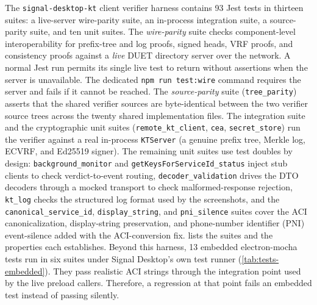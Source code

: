 The \texttt{signal-desktop-kt} client verifier harness contains \num{93} Jest tests in thirteen
suites: a live-server wire-parity suite, an in-process integration suite, a source-parity suite,
and ten unit suites. The \emph{wire-parity} suite checks component-level interoperability for
prefix-tree and log proofs, signed heads, VRF proofs, and consistency proofs against a \emph{live}
DUET directory server over the network. A normal Jest run permits its single live test to
return without assertions when the server is unavailable. The dedicated \texttt{npm run test:wire}
command requires the server and fails if it cannot be reached. The \emph{source-parity} suite
(\texttt{tree\_parity}) asserts that the shared verifier sources are byte-identical between the two
verifier source trees across the twenty shared implementation files. The integration suite and the
cryptographic unit suites (\texttt{remote\_kt\_client}, \texttt{cea}, \texttt{secret\_store}) run
the verifier against a real in-process \texttt{KTServer} (a genuine prefix tree, Merkle log, ECVRF,
and Ed25519 signer). The remaining unit suites use test doubles by design: \texttt{background\_monitor}
and \texttt{getKeysForServiceId\_status} inject stub clients to check verdict-to-event routing,
\texttt{decoder\_validation} drives the DTO decoders through a mocked transport to check
malformed-response rejection, \texttt{kt\_log} checks the structured log format used by the screenshots,
and the \texttt{canonical\_service\_id}, \texttt{display\_string}, and
\texttt{pni\_silence} suites cover the ACI canonicalization, display-string preservation, and
phone-number identifier (PNI) event-silence added with the ACI-conversion fix.
 lists the suites and the properties each establishes.
Beyond this harness, \num{13} embedded electron-mocha tests run in six suites under Signal
Desktop's own test runner (\cref{tab:tests-embedded}). They pass realistic ACI strings through the
integration point used by the live preload callers. Therefore, a regression at that point fails an
embedded test instead of passing silently.

